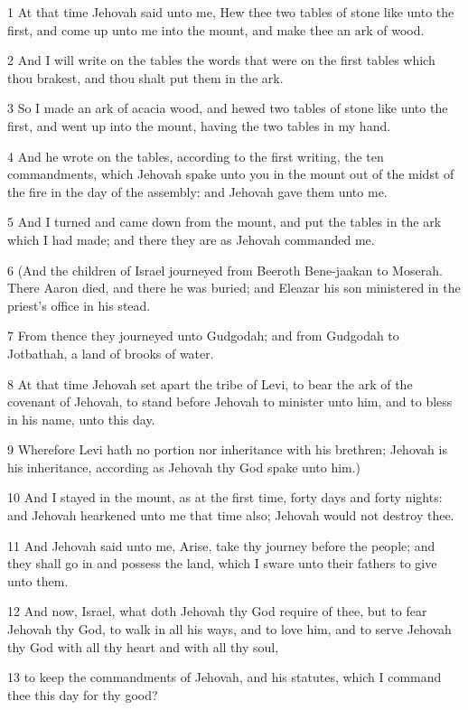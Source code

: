 \par 1 At that time Jehovah said unto me, Hew thee two tables of stone like unto the first, and come up unto me into the mount, and make thee an ark of wood.
\par 2 And I will write on the tables the words that were on the first tables which thou brakest, and thou shalt put them in the ark.
\par 3 So I made an ark of acacia wood, and hewed two tables of stone like unto the first, and went up into the mount, having the two tables in my hand.
\par 4 And he wrote on the tables, according to the first writing, the ten commandments, which Jehovah spake unto you in the mount out of the midst of the fire in the day of the assembly: and Jehovah gave them unto me.
\par 5 And I turned and came down from the mount, and put the tables in the ark which I had made; and there they are as Jehovah commanded me.
\par 6 (And the children of Israel journeyed from Beeroth Bene-jaakan to Moserah. There Aaron died, and there he was buried; and Eleazar his son ministered in the priest's office in his stead.
\par 7 From thence they journeyed unto Gudgodah; and from Gudgodah to Jotbathah, a land of brooks of water.
\par 8 At that time Jehovah set apart the tribe of Levi, to bear the ark of the covenant of Jehovah, to stand before Jehovah to minister unto him, and to bless in his name, unto this day.
\par 9 Wherefore Levi hath no portion nor inheritance with his brethren; Jehovah is his inheritance, according as Jehovah thy God spake unto him.)
\par 10 And I stayed in the mount, as at the first time, forty days and forty nights: and Jehovah hearkened unto me that time also; Jehovah would not destroy thee.
\par 11 And Jehovah said unto me, Arise, take thy journey before the people; and they shall go in and possess the land, which I sware unto their fathers to give unto them.
\par 12 And now, Israel, what doth Jehovah thy God require of thee, but to fear Jehovah thy God, to walk in all his ways, and to love him, and to serve Jehovah thy God with all thy heart and with all thy soul,
\par 13 to keep the commandments of Jehovah, and his statutes, which I command thee this day for thy good?
